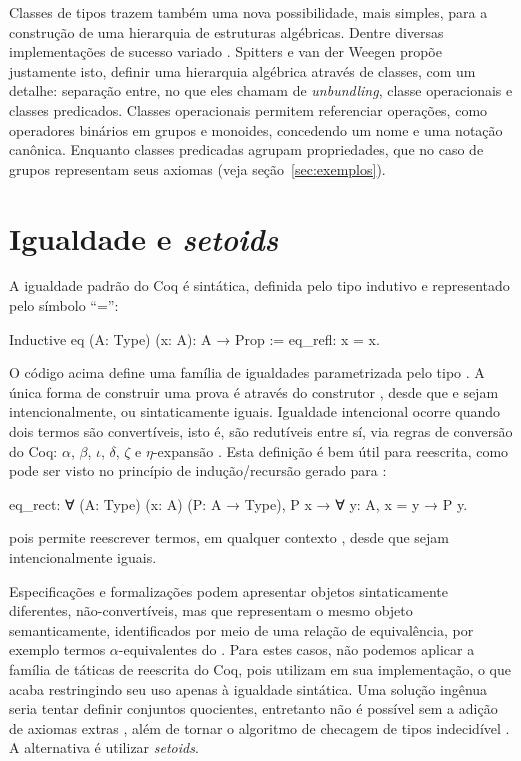 Classes de tipos trazem também uma nova possibilidade, mais simples, para a construção de uma hierarquia de estruturas algébricas. Dentre diversas implementações de sucesso variado \cite{Geuvers2002,CruzFilipe2004,Garillot2009,Cohen2020}. Spitters e van der Weegen \cite{Spitters2011} propõe justamente isto, definir uma hierarquia algébrica através de classes, com um detalhe: separação entre, no que eles chamam de \textit{unbundling}, classe operacionais e classes predicados. Classes operacionais permitem referenciar operações, como operadores binários em grupos e monoides, concedendo um nome e uma notação canônica. Enquanto classes predicadas agrupam propriedades, que no caso de grupos representam seus axiomas (veja seção~\ref{sec:exemplos}).

\section{Igualdade e \textit{setoids}}\label{sec:igualdade}
A igualdade padrão do Coq é sintática, definida pelo tipo indutivo  e representado pelo símbolo ``='':
\begin{coqcode}
Inductive eq (A: Type) (x: A): A → Prop := eq_refl: x = x.	
\end{coqcode}
O código acima define uma família de igualdades parametrizada pelo tipo . A única forma de construir uma prova  é através do construtor , desde que  e  sejam intencionalmente, ou sintaticamente iguais. Igualdade intencional ocorre quando dois termos são convertíveis, isto é, são redutíveis entre sí, via regras de conversão do Coq: $\alpha$, $\beta$, $\iota$, $\delta$, $\zeta$ e $\eta$-expansão \cite{CoqConversion}.  Esta definição é bem útil para reescrita, como pode ser visto no princípio de indução/recursão gerado para :
\begin{coqcode}
eq_rect: ∀ (A: Type) (x: A) (P: A → Type), P x → ∀ y: A, x = y → P y.
\end{coqcode}
pois permite reescrever termos, em qualquer contexto , desde que sejam intencionalmente iguais. 

Especificações e formalizações podem apresentar objetos sintaticamente diferentes, não-convertíveis, mas que representam o mesmo objeto semanticamente, identificados por meio de uma relação de equivalência, por exemplo termos $\alpha$-equivalentes do \lcalc. Para estes casos, não podemos aplicar a família de táticas de reescrita do Coq, pois utilizam  em sua implementação, o que acaba restringindo seu uso apenas à igualdade sintática. Uma solução ingênua seria tentar definir conjuntos quocientes, entretanto não é possível sem a adição de axiomas extras \cite{Chicli2003}, além de tornar o algoritmo de checagem de tipos indecidível \cite{Geuvers2002}. A alternativa é utilizar \textit{setoids}.

